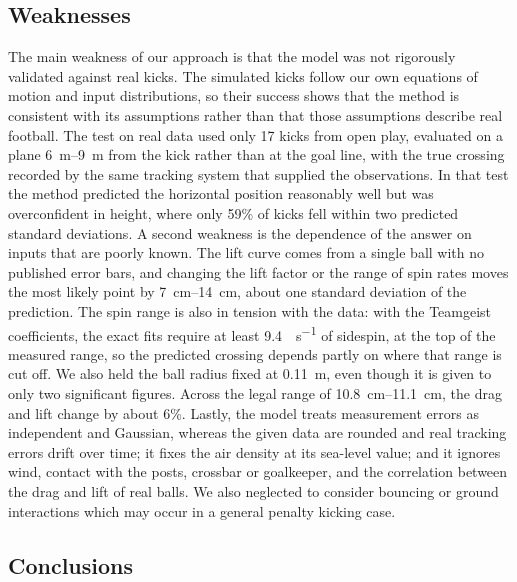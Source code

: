 \documentclass[10pt,a4paper]{article}
\begin{document}
\subsection{Weaknesses}

The main weakness of our approach is that the model was not rigorously validated against
real kicks. The simulated kicks follow our own equations of motion and input
distributions, so their success shows that the method is consistent with its
assumptions rather than that those assumptions describe real football. The
test on real data used only 17 kicks from open play, evaluated on a plane
\SIrange{6}{9}{\metre} from the kick rather than at the goal line, with the
true crossing recorded by the same tracking system that supplied the
observations. In that test the method predicted the horizontal position
reasonably well but was overconfident in height, where only 59\% of kicks
fell within two predicted standard deviations. A second weakness is the
dependence of the answer on inputs that are poorly known. The lift curve
comes from a single ball with no published error bars, and changing the lift
factor or the range of spin rates moves the most likely point by
\SIrange{7}{14}{\centi\metre}, about one standard deviation of the
prediction. The spin range is also in tension with the data: with the
Teamgeist coefficients, the exact fits require at least
\SI{9.4}{\rev\per\second} of sidespin, at the top of the measured range, so
the predicted crossing depends partly on where that range is cut off. We
also held the ball radius fixed at \SI{0.11}{\metre}, even though it is given to
only two significant figures. Across the legal range of
\SIrange{10.8}{11.1}{\centi\metre}, the drag and lift change by about 6\%. Lastly, the model treats measurement
errors as independent and Gaussian, whereas the given data are rounded and
real tracking errors drift over time; it fixes the air density at its
sea-level value; and it ignores wind, contact with the posts, crossbar or
goalkeeper, and the correlation between the drag and lift of real balls. We also neglected to consider bouncing or ground interactions which may occur in a general penalty kicking case.

\subsection{Conclusions}
\end{document}
